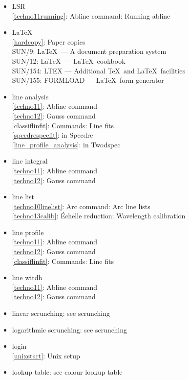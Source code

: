 \documentclass[11pt,twoside]{article}
\newcommand{\htmlref}[2]{#1}
\newcommand{\xref}[3]{#1}
\newcommand{\idxint}[2]{\ref{#1}: \htmlref{#2}{#1}}
\newcommand{\idxint}[2]{\htmlref{#2}{#1}}
\newcommand{\latorhtm}[2]{#1}
\newcommand{\latorhtm}[2]{#2}
\begin{document}
\begin{itemize}
\item LSR\\
   \idxint{techno11running}{Abline command: Running abline}
\item \LaTeX\\
   \idxint{hardcopy}{Paper copies}\\
   \xref{SUN/9: \LaTeX\ \latorhtm{---}{-} A document preparation system}{sun9}{}\\
   \xref{SUN/12: \LaTeX\ \latorhtm{---}{-} \LaTeX\ cookbook}{sun12}{}\\
   \xref{SUN/154: LTEX \latorhtm{---}{-} Additional \TeX\ and \LaTeX\ facilities}{sun154}{}\\
   \xref{SUN/155: FORMLOAD \latorhtm{---}{-} \LaTeX\ form generator}{sun155}{}
\item line analysis\\
   \idxint{techno11}{Abline command}\\
   \idxint{techno12}{Gauss command}\\
   \idxint{classiflinfit}{Commands: Line fits}\\
   \idxint{specdrespecfit}{in Specdre}\\
   \idxint{line_profile_analysis}{in Twodspec}
\item line integral\\
   \idxint{techno11}{Abline command}\\
   \idxint{techno12}{Gauss command}
\item line list\\
   \idxint{techno10linelist}{Arc command: Arc line lists}\\
   \idxint{techno13calib}{\'Echelle reduction: Wavelength calibration}
\item line profile\\
   \idxint{techno11}{Abline command}\\
   \idxint{techno12}{Gauss command}\\
   \idxint{classiflinfit}{Commands: Line fits}
\item line witdh\\
   \idxint{techno11}{Abline command}\\
   \idxint{techno12}{Gauss command}
\item linear scrunching: see scrunching
\item logarithmic scrunching: see scrunching
\item login\\
   \idxint{unixstart}{Unix setup}
\item lookup table: see colour lookup table
\end{itemize}
\end{document}
